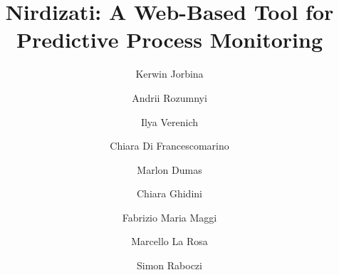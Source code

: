 \documentclass[runningheads,a4paper]{llncs}
\begin{document}
\mainmatter  %

\title{Nirdizati: A Web-Based Tool for\\ Predictive Process Monitoring}


%
%
\author{Kerwin Jorbina \and Andrii Rozumnyi \and Ilya Verenich  \and Chiara Di Francescomarino \and  Marlon Dumas  \and Chiara Ghidini  \and Fabrizio Maria Maggi \and Marcello La Rosa \and Simon Raboczi}


%
%

\maketitle
\end{document}
